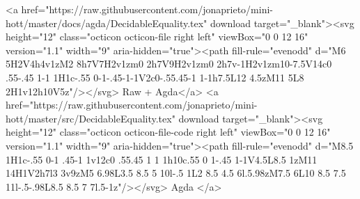         <a href="https://raw.githubusercontent.com/jonaprieto/mini-hott/master/docs/agda/DecidableEquality.tex" download target="_blank"><svg height="12" class="octicon octicon-file right left" viewBox="0 0 12 16" version="1.1" width="9" aria-hidden="true"><path fill-rule="evenodd" d="M6 5H2V4h4v1zM2 8h7V7H2v1zm0 2h7V9H2v1zm0 2h7v-1H2v1zm10-7.5V14c0 .55-.45 1-1 1H1c-.55 0-1-.45-1-1V2c0-.55.45-1 1-1h7.5L12 4.5zM11 5L8 2H1v12h10V5z"/></svg> Raw + Agda</a>
        <a href="https://raw.githubusercontent.com/jonaprieto/mini-hott/master/src/DecidableEquality.tex" download target="_blank"><svg height="12" class="octicon octicon-file-code right left" viewBox="0 0 12 16" version="1.1" width="9" aria-hidden="true"><path fill-rule="evenodd" d="M8.5 1H1c-.55 0-1 .45-1 1v12c0 .55.45 1 1 1h10c.55 0 1-.45 1-1V4.5L8.5 1zM11 14H1V2h7l3 3v9zM5 6.98L3.5 8.5 5 10l-.5 1L2 8.5 4.5 6l.5.98zM7.5 6L10 8.5 7.5 11l-.5-.98L8.5 8.5 7 7l.5-1z"/></svg> Agda </a>
      
